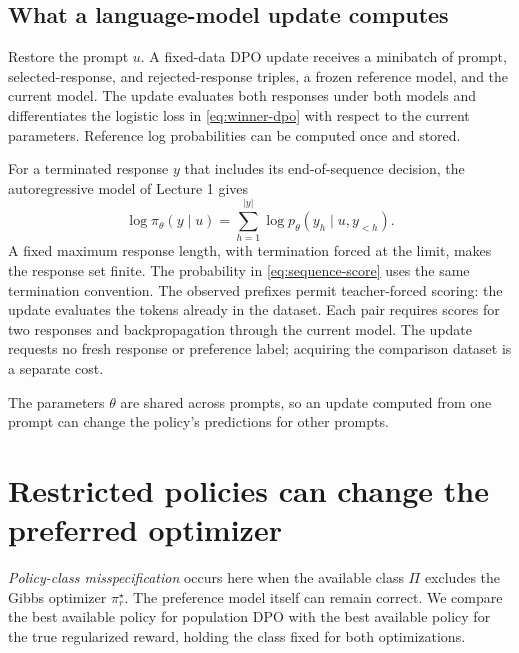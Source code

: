 \documentclass[11pt,twoside]{article}
\theoremstyle{definition}
\theoremstyle{remark}
\begin{document}
\subsection{What a language-model update computes}

Restore the prompt $u$. A fixed-data DPO update receives a minibatch of
prompt, selected-response, and rejected-response triples, a frozen
reference model, and the current model. The update evaluates both responses
under both models and differentiates the logistic loss in
\cref{eq:winner-dpo} with respect to the current parameters. Reference
log probabilities can be computed once and stored.

For a terminated response $y$ that includes its end-of-sequence decision,
the autoregressive model of Lecture 1 gives
\begin{equation}
 \log\pi_\theta(y\mid u)
 =\sum_{h=1}^{|y|}\log p_\theta(y_h\mid u,y_{<h}).
 \label{eq:sequence-score}
\end{equation}
A fixed maximum response length, with termination forced at the limit,
makes the response set finite. The probability in \cref{eq:sequence-score}
uses the same termination convention. The observed prefixes permit
teacher-forced scoring: the update evaluates the tokens already in the
dataset. Each pair requires scores for two responses and backpropagation
through the current model. The update requests no fresh response or preference
label; acquiring the comparison dataset is a separate cost.%
\label{en:length}

The parameters $\theta$ are shared across prompts, so an update computed
from one prompt can change the policy's predictions for other prompts.

\section{Restricted policies can change the preferred optimizer}
\label{sec:restricted}

\emph{Policy-class misspecification} occurs here when the available class
$\Pi$ excludes the Gibbs optimizer $\pi_r^\star$. The preference model
itself can remain correct. We compare the best available policy for
population DPO with the best available policy for the true regularized
reward, holding the class fixed for both optimizations.
\end{document}
